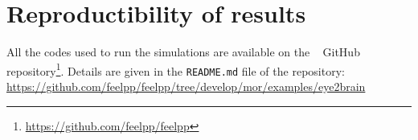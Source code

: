 \section{Reproductibility of results}
\label{app:reproduce}

All the codes used to run the simulations are available on the \fpp{}~\cite{christophe_prud_homme_2023_8272196} GitHub repository\footnote{\url{https://github.com/feelpp/feelpp}}.
Details are given in the \texttt{README.md} file of the repository: \url{https://github.com/feelpp/feelpp/tree/develop/mor/examples/eye2brain}